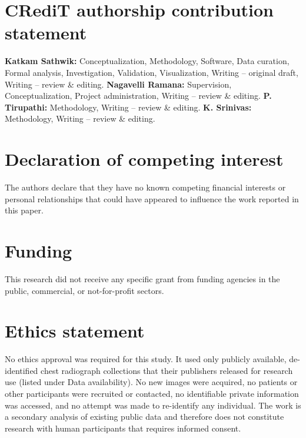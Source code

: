 
\section*{CRediT authorship contribution statement}

\textbf{Katkam Sathwik:} Conceptualization, Methodology, Software, Data curation, Formal analysis, Investigation, Validation, Visualization, Writing -- original draft, Writing -- review \& editing.
\textbf{Nagavelli Ramana:} Supervision, Conceptualization, Project administration, Writing -- review \& editing.
\textbf{P. Tirupathi:} Methodology, Writing -- review \& editing.
\textbf{K. Srinivas:} Methodology, Writing -- review \& editing.

\section*{Declaration of competing interest}
The authors declare that they have no known competing financial interests or personal relationships that could have appeared to influence the work reported in this paper. 

\section*{Funding}
This research did not receive any specific grant from funding agencies in the public, commercial, or not-for-profit sectors. 

\section*{Ethics statement}
No ethics approval was required for this study. It used only publicly available, de-identified chest radiograph collections that their publishers released for research use (listed under Data availability). No new images were acquired, no patients or other participants were recruited or contacted, no identifiable private information was accessed, and no attempt was made to re-identify any individual. The work is a secondary analysis of existing public data and therefore does not constitute research with human participants that requires informed consent. 

